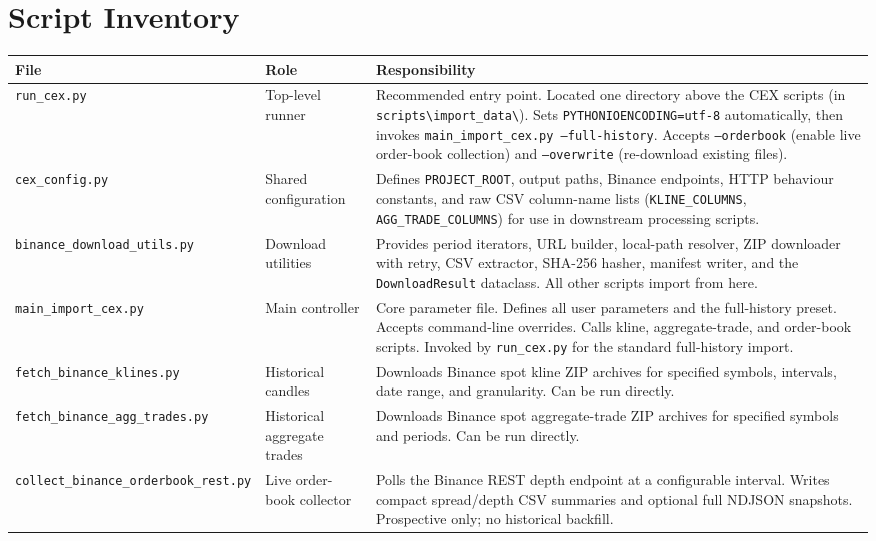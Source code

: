 \documentclass[11pt,a4paper]{article}
\begin{document}
\section{Script Inventory}
\label{sec:inventory}

\begin{xltabular}{\linewidth}{L{5.0cm}L{2.8cm}Y}
\toprule
\textbf{File} & \textbf{Role} & \textbf{Responsibility} \\
\midrule
\texttt{run\_cex.py} & Top-level runner &
  Recommended entry point. Located one directory above the CEX scripts
  (in \texttt{scripts\textbackslash import\_data\textbackslash}).
  Sets \texttt{PYTHONIOENCODING=utf-8} automatically, then invokes
  \texttt{main\_import\_cex.py --full-history}. Accepts
  \texttt{--orderbook} (enable live order-book collection) and
  \texttt{--overwrite} (re-download existing files). \\
\addlinespace
\texttt{cex\_config.py} & Shared configuration &
  Defines \texttt{PROJECT\_ROOT}, output paths, Binance endpoints,
  HTTP behaviour constants, and raw CSV column-name lists
  (\texttt{KLINE\_COLUMNS}, \texttt{AGG\_TRADE\_COLUMNS}) for use in
  downstream processing scripts. \\
\addlinespace
\texttt{binance\_download\_utils.py} & Download utilities &
  Provides period iterators, URL builder, local-path resolver,
  ZIP downloader with retry, CSV extractor, SHA-256 hasher,
  manifest writer, and the \texttt{DownloadResult} dataclass.
  All other scripts import from here. \\
\addlinespace
\texttt{main\_import\_cex.py} & Main controller &
  Core parameter file. Defines all user parameters and the
  full-history preset. Accepts command-line overrides. Calls kline,
  aggregate-trade, and order-book scripts. Invoked by
  \texttt{run\_cex.py} for the standard full-history import. \\
\addlinespace
\texttt{fetch\_binance\_klines.py} & Historical candles &
  Downloads Binance spot kline ZIP archives for specified symbols,
  intervals, date range, and granularity. Can be run directly. \\
\addlinespace
\texttt{fetch\_binance\_agg\_trades.py} & Historical aggregate trades &
  Downloads Binance spot aggregate-trade ZIP archives for specified
  symbols and periods. Can be run directly. \\
\addlinespace
\texttt{collect\_binance\_orderbook\_rest.py} & Live order-book
  collector &
  Polls the Binance REST depth endpoint at a configurable interval.
  Writes compact spread/depth CSV summaries and optional full
  NDJSON snapshots. Prospective only; no historical backfill. \\
\bottomrule
\end{xltabular}
\end{document}
